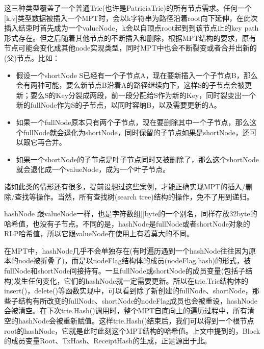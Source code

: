 \documentclass[UTF8]{ctexart}
\begin{document}
这三种类型覆盖了一个普通Trie(也许是PatriciaTrie)的所有节点需求。任何一个[k,v]类型数据被插入一个MPT时，会以k字符串为路径沿着root向下延伸，在此次插入结束时首先成为一个valueNode，k会以自顶点root起到到该节点止的key path形式存在。但之后随着其他节点的不断插入和删除，根据MPT结构的要求，原有节点可能会变化成其他node实现类型，同时MPT中也会不断裂变或者合并出新的(父)节点。比如：

\begin{itemize}

\item 假设一个shortNode S已经有一个子节点A，现在要新插入一个子节点B，那么会有两种可能，要么新节点B沿着A的路径继续向下，这样S的子节点会被更新；要么S的Key分裂成两段，前一段分配给S作为新的Key，同时裂变出一个新的fullNode作为S的子节点，以同时容纳B，以及需要更新的A。

\item 如果一个fullNode原本只有两个子节点，现在要删除其中一个子节点，那么这个fullNode就会退化为shortNode，同时保留的子节点如果是shortNode，还可以跟它再合并。

\item 如果一个shortNode的子节点是叶子节点同时又被删除了，那么这个shortNode就会退化成一个valueNode，成为一个叶子节点。

\end{itemize}

诸如此类的情形还有很多，提前设想过这些案例，才能正确实现MPT的插入/删除/查找等操作。当然，所有查找树(search tree)结构的操作，免不了用到递归。


hashNode 跟valueNode一样，也是字符数组[]byte的一个别名，同样存放32byte的哈希值，也没有子节点。不同的是，hashNode是fullNode或者shortNode对象的RLP哈希值，所以它跟valueNode在使用上有着莫大的不同。

在MPT中，hashNode几乎不会单独存在(有时遍历遇到一个hashNode往往因为原本的node被折叠了)，而是以nodeFlag结构体的成员(nodeFlag.hash)的形式，被fullNode和shortNode间接持有。一旦fullNode或shortNode的成员变量(包括子结构)发生任何变化，它们的hashNode就一定需要更新。所以在trie.Trie结构体的insert()，delete()等函数实现中，可以看到除了新创建的fullNode、shortNode，那些子结构有所改变的fullNode、shortNode的nodeFlag成员也会被重设，hashNode会被清空。在下次trie.Hash()调用时，整个MPT自底向上的遍历过程中，所有清空的hashNode会被重新赋值。这样trie.Hash()结束后，我们可以得到一个根节点root的hashNode，它就是此时此刻这个MPT结构的哈希值。上文中提到的，Block的成员变量Root、TxHash、ReceiptHash的生成，正是源出于此。
\end{document}
